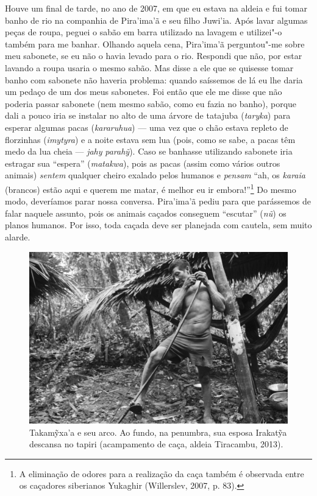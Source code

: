 Houve um final de tarde, no ano de 2007, em que eu estava na aldeia e
fui tomar banho de rio na companhia de Pira'ima'ã e seu filho Juwi'ia.
Após lavar algumas peças de roupa, peguei o sabão em barra utilizado na
lavagem e utilizei"-o também para me banhar. Olhando aquela cena,
Pira'ima'ã perguntou"-me sobre meu sabonete, se eu não o havia levado
para o rio. Respondi que não, por estar lavando a roupa usaria o mesmo
sabão. Mas disse a ele que se quisesse tomar banho com sabonete não
haveria problema: quando saíssemos de lá eu lhe daria um pedaço de um
dos meus sabonetes. Foi então que ele me disse que não poderia passar
sabonete (nem mesmo sabão, como eu fazia no banho), porque dali a pouco
iria se instalar no alto de uma árvore de tatajuba (\emph{taryka}) para
esperar algumas pacas (\emph{kararuhua}) --- uma vez que o chão estava
repleto de florzinhas (\emph{imytyra}) e a noite estava sem lua (pois,
como se sabe, a pacas têm medo da lua cheia --- \emph{jahy}
\emph{parahỹ}). Caso se banhasse utilizando sabonete iria estragar sua
``espera'' (\emph{matakwa}), pois as pacas (assim como vários outros
animais) \emph{sentem} qualquer cheiro exalado pelos humanos e
\emph{pensam} ``ah, os \emph{karaia} (brancos) estão aqui e querem me
matar, é melhor eu ir embora!''\footnote{A eliminação de odores para a
  realização da caça também é observada entre os caçadores siberianos
  Yukaghir (Willerslev, 2007, p. 83).} Do mesmo modo, deveríamos parar
nossa conversa. Pira'ima'ã pediu para que parássemos de falar naquele
assunto, pois os animais caçados conseguem ``escutar'' (\emph{nũ}) os
planos humanos. Por isso, toda caçada deve ser planejada com cautela,
sem muito alarde.

\begin{figure}[H]
\centering
  \includegraphics[width=\textwidth]{./imgs/IMG_1669}
\caption{Takamỹxa'a e seu arco. Ao fundo, na penumbra, sua esposa Irakatỹa descansa no tapiri (acampamento de caça, aldeia Tiracambu, 2013).}
\end{figure}

